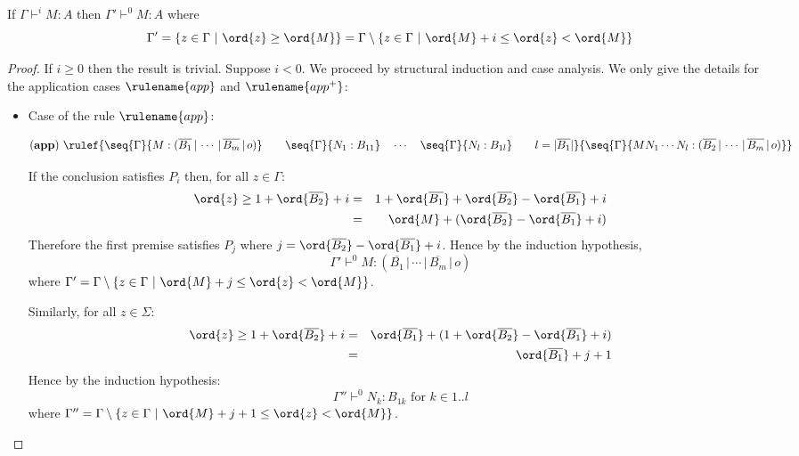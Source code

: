 \begin{lemma}
\label{lem:restriction}

If $\Gamma \vdash^i M : A$ then $\Gamma' \vdash^{0} M : A$
where $$\Gamma' = \{ z \in \Gamma \ |
\ \ord{z} \geq \ord{M} \} = \Gamma \setminus \{ z \in \Gamma \ | \ \ord{M} + i \leq \ord{z} < \ord{M} \}$$
\end{lemma}
\begin{proof}
If $i\geq 0$ then the result is trivial. Suppose $i<0$. We proceed
by structural induction and case analysis. We only give the details
for the application cases $\rulename{app}$ and $\rulename{app^+}$:
\begin{itemize}
\item Case of the rule $\rulename{app}$:

    \[ (\mathbf{app}) \
    \rulef
        {\seq{\Gamma}{M : (\overline{B_1} \, | \, \cdots \, | \, \overline{B_m} \, | \, o)} \qquad
            \seq{\Gamma}{N_1 : B_{11}} \quad \cdots \quad \seq{\Gamma}{N_{l} :
            B_{1l}} \qquad l = |\overline{B_1}| }
        { \seq{\Gamma}{M N_1
            \cdots N_{l} : (\overline{B_2} \, | \, \cdots \, | \,
            \overline{B_m} \, | \, o)}}
    \]

    If the conclusion satisfies $P_i$ then, for all $z \in \Gamma$:
    \begin{eqnarray*}
    \ord{z} \geq 1 + \ord{\overline{B_2}} + i
    &=& 1 + \ord{\overline{B_1}} + \ord{\overline{B_2}} - \ord{\overline{B_1}} + i \\
    &=& \ord{M} + (\ord{\overline{B_2}} - \ord{\overline{B_1}} + i)
    \end{eqnarray*}
    Therefore the first premise satisfies $P_j$ where $j={\ord{\overline{B_2}} - \ord{\overline{B_1}} + i}$.
    Hence by the induction hypothesis,
    $$\Gamma' \vdash^{0} M : (\overline{B_1} \, | \, \cdots \, | \, \overline{B_m} \, | \, o)$$
    where $\Gamma' = \Gamma \setminus \{ z \in \Gamma \ | \ \ord{M} + j \leq \ord{z} < \ord{M} \}$.


    Similarly, for all $z \in \Sigma$:
    \begin{eqnarray*}
    \ord{z} \geq 1 + \ord{\overline{B_2}} + i
    &=& \ord{\overline{B_1}} + (1+\ord{\overline{B_2}} - \ord{\overline{B_1}} + i) \\
    &=& \ord{\overline{B_1}} + j+1
    \end{eqnarray*}
    Hence by the induction hypothesis:
    $$\Gamma'' \vdash^0 N_k : B_{1k} \mbox{ for } k \in 1..l$$
    where $\Gamma'' = \Gamma \setminus \{ z \in \Gamma \ | \ \ord{M} + j+1 \leq \ord{z} < \ord{M} \}$.


\end{itemize}
\end{proof}
